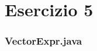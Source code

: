 \section*{Esercizio 5}

\subsubsection*{VectorExpr.java}
\inputminted{java}{tex/src/5/VectorExpr.java}
